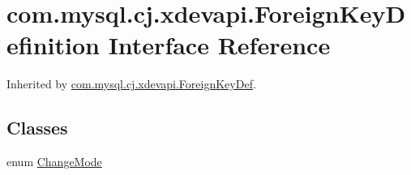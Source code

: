 \hypertarget{interfacecom_1_1mysql_1_1cj_1_1xdevapi_1_1_foreign_key_definition}{}\section{com.\+mysql.\+cj.\+xdevapi.\+Foreign\+Key\+Definition Interface Reference}
\label{interfacecom_1_1mysql_1_1cj_1_1xdevapi_1_1_foreign_key_definition}


Inherited by \mbox{\hyperlink{classcom_1_1mysql_1_1cj_1_1xdevapi_1_1_foreign_key_def}{com.\+mysql.\+cj.\+xdevapi.\+Foreign\+Key\+Def}}.

\subsection*{Classes}
\begin{DoxyCompactItemize}
\item 
enum \mbox{\hyperlink{enumcom_1_1mysql_1_1cj_1_1xdevapi_1_1_foreign_key_definition_1_1_change_mode}{Change\+Mode}}
\end{DoxyCompactItemize}
